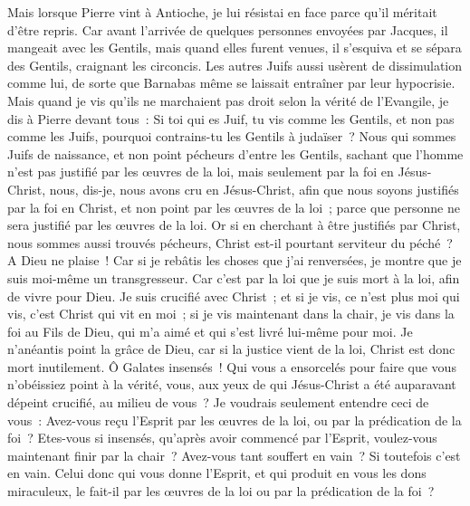 \begin{multicols}{2}
Mais lorsque Pierre vint à Antioche, je lui résistai en face parce qu'il méritait d'être repris.
Car avant l'arrivée de quelques personnes envoyées par Jacques, il mangeait avec les Gentils, mais quand elles furent venues, il s'esquiva et se sépara des Gentils, craignant les circoncis.
Les autres Juifs aussi usèrent de dissimulation comme lui, de sorte que Barnabas même se laissait entraîner par leur hypocrisie.
Mais quand je vis qu'ils ne marchaient pas droit selon la vérité de l'Evangile, je dis à Pierre devant tous~: Si toi qui es Juif, tu vis comme les Gentils, et non pas comme les Juifs, pourquoi contrains-tu les Gentils à judaïser~?
Nous qui sommes Juifs de naissance, et non point pécheurs d'entre les Gentils,
sachant que l'homme n'est pas justifié par les œuvres de la loi, mais seulement par la foi en Jésus-Christ, nous, dis-je, nous avons cru en Jésus-Christ, afin que nous soyons justifiés par la foi en Christ, et non point par les œuvres de la loi~; parce que personne ne sera justifié par les œuvres de la loi.
Or si en cherchant à être justifiés par Christ, nous sommes aussi trouvés pécheurs, Christ est-il pourtant serviteur du péché~? A Dieu ne plaise~!
Car si je rebâtis les choses que j'ai renversées, je montre que je suis moi-même un transgresseur.
Car c'est par la loi que je suis mort à la loi, afin de vivre pour Dieu.
Je suis crucifié avec Christ~; et si je vis, ce n'est plus moi qui vis, c'est Christ qui vit en moi~; si je vis maintenant dans la chair, je vis dans la foi au Fils de Dieu, qui m'a aimé et qui s'est livré lui-même pour moi.
Je n'anéantis point la grâce de Dieu, car si la justice vient de la loi, Christ est donc mort inutilement.
\VerseOne{}Ô Galates insensés~! Qui vous a ensorcelés pour faire que vous n'obéissiez point à la vérité, vous, aux yeux de qui Jésus-Christ a été auparavant dépeint crucifié, au milieu de vous~?
Je voudrais seulement entendre ceci de vous~: Avez-vous reçu l'Esprit par les œuvres de la loi, ou par la prédication de la foi~?
Etes-vous si insensés, qu'après avoir commencé par l'Esprit, voulez-vous maintenant finir par la chair~?
Avez-vous tant souffert en vain~? Si toutefois c'est en vain.
Celui donc qui vous donne l'Esprit, et qui produit en vous les dons miraculeux, le fait-il par les œuvres de la loi ou par la prédication de la foi~?

\end{multicols}
